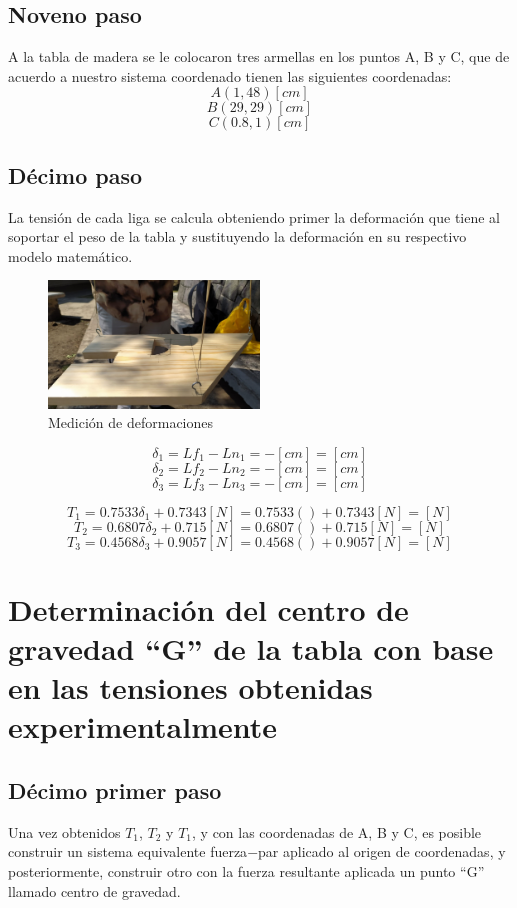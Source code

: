\documentclass[12pt, titlepage]{report}
\begin{document}
    \subsection*{Noveno paso}
    A la tabla de madera se le colocaron tres armellas en los puntos A, B y C, que de acuerdo a nuestro sistema coordenado tienen las siguientes coordenadas:
    $$A(1, 48) [cm]$$
    $$B(29, 29) [cm]$$
    $$C(0.8, 1) [cm]$$

    \subsection*{Décimo paso}
    La tensión de cada liga se calcula obteniendo primer la deformación que tiene al soportar el peso de la tabla y sustituyendo la deformación en su respectivo modelo matemático. 

    \begin{figure}[ht]
        \centering
        \includegraphics[width=0.5\textwidth]{Medicion.jpg}
        \caption{Medición de deformaciones}
    \end{figure}

    $$\delta_1=Lf_1-Ln_1= - [cm] = [cm]$$
    $$\delta_2=Lf_2-Ln_2= - [cm] = [cm]$$
    $$\delta_3=Lf_3-Ln_3= - [cm] = [cm]$$

    $$T_1 = 0.7533\delta_1 + 0.7343 [N] = 0.7533() + 0.7343 [N] = [N]$$
    $$T_2 = 0.6807\delta_2 + 0.715 [N] = 0.6807()+ 0.715 [N] = [N]$$
    $$T_3 = 0.4568\delta_3 + 0.9057 [N] = 0.4568() + 0.9057 [N] = [N]$$

    \hfill
    \section{Determinación del centro de gravedad ``G'' de la tabla con base en las tensiones obtenidas experimentalmente}
    \subsection*{Décimo primer paso}
    Una vez obtenidos $T_{1}$, $T_{2}$ y $T_{1}$, y con las coordenadas de A, B y C, es posible construir un sistema equivalente fuerza$-$par aplicado al origen de coordenadas, y posteriormente, construir otro con la fuerza resultante aplicada un punto ``G'' llamado centro de gravedad.
\end{document}
